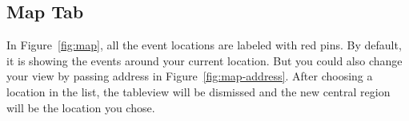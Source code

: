 \subsection{Map Tab} %
\label{sub:map_tab}

In Figure~\ref{fig:map}, all the event locations are labeled with red pins. By default, it is showing the events around your current location. But you could also change your view by passing address in Figure~\ref{fig:map-address}. After choosing a location in the list, the tableview will be dismissed and the new central region will be the location you chose. 

\begin{figure}
	\centering
	 \hfill

\end{figure}
